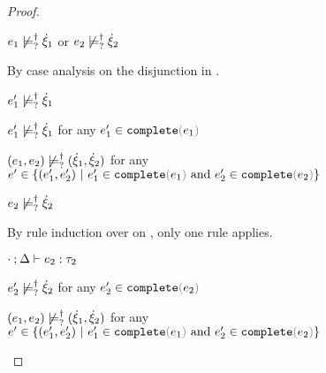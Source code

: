 \begin{proof}
\begin{byCases}
\begin{byCases}
\begin{pfsteps*}
      \item $e_1 \not\models_{?}^{\dag} \dot{\xi}_1$ or $e_2 \not\models_{?}^{\dag} \dot{\xi}_2$  
      \end{pfsteps*}
      By case analysis on the disjunction in .
      \begin{byCases}
        \item[\cnotsatisfyormay{e_1}{\hxi_1}]
        \begin{pfsteps*}
        \item $e_1' \not\models_{?}^{\dag} \dot{\xi}_1$  
        \item $e_1' \not\models_{?}^{\dag} \dot{\xi}_1$ for any $e_1' \in \expcomplete{e_1}$  
        \item $(e_1 , e_2) \not\models_{?}^{\dag} (\dot{\xi}_1 , \dot{\xi}_2)$ for any $e' \in \{\hpair{e_1'}{e_2'} ~\vert~ e_1' \in \expcomplete{e_1} \textand e_2' \in \expcomplete{e_2}\}$ 
        \end{pfsteps*} 
        \item[\cnotsatisfyormay{e_2}{\hxi_2}]
        \begin{pfsteps*}
        \item $e_2 \not\models_{?}^{\dag} \dot{\xi}_2$  
        \end{pfsteps*}
        By rule induction over  on , only one rule applies.
        \begin{byCases}
          \item[\text{(\ref{rule:TPair})}]
          \begin{pfsteps*}
          \item $\cdot \mathbin{;} \Delta \vdash e_2 : \tau_2$  
          \item $e_2' \not\models_{?}^{\dag} \dot{\xi}_2$ for any $e_2' \in \expcomplete{e_2}$  
          \item $(e_1 , e_2) \not\models_{?}^{\dag} (\dot{\xi}_1 , \dot{\xi}_2)$ for any $e' \in \{\hpair{e_1'}{e_2'} ~\vert~ e_1' \in \expcomplete{e_1} \textand e_2' \in \expcomplete{e_2}\}$ 

\end{pfsteps*}
\end{byCases}
\end{byCases}
\end{byCases}
\end{byCases}
\end{proof}
